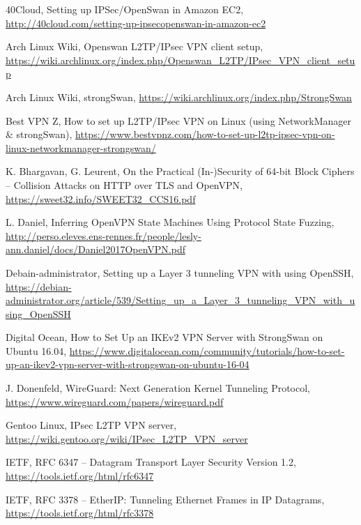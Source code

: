 \begin{thebibliography}{10}

  40Cloud, Setting up IPSec/OpenSwan in Amazon EC2,
  \url{http://40cloud.com/setting-up-ipsecopenswan-in-amazon-ec2}

  Arch Linux Wiki, Openswan L2TP/IPsec VPN client setup,
  \url{https://wiki.archlinux.org/index.php/Openswan_L2TP/IPsec_VPN_client_setup}

  Arch Linux Wiki, strongSwan,
  \url{https://wiki.archlinux.org/index.php/StrongSwan}

  Best VPN Z, How to set up L2TP/IPsec VPN on Linux (using NetworkManager \& strongSwan),
  \url{https://www.bestvpnz.com/how-to-set-up-l2tp-ipsec-vpn-on-linux-networkmanager-strongswan/}

  K. Bhargavan, G. Leurent, On the Practical (In-)Security of 64-bit Block Ciphers -- Collision Attacks on HTTP over TLS and OpenVPN,
  \url{https://sweet32.info/SWEET32_CCS16.pdf}

  L. Daniel, Inferring OpenVPN State Machines Using Protocol State Fuzzing,
  \url{http://perso.eleves.ens-rennes.fr/people/lesly-ann.daniel/docs/Daniel2017OpenVPN.pdf}

  Debain-administrator, Setting up a Layer 3 tunneling VPN with using OpenSSH,
  \url{https://debian-administrator.org/article/539/Setting_up_a_Layer_3_tunneling_VPN_with_using_OpenSSH}

  Digital Ocean, How to Set Up an IKEv2 VPN Server with StrongSwan on Ubuntu 16.04,
  \url{https://www.digitalocean.com/community/tutorials/how-to-set-up-an-ikev2-vpn-server-with-strongswan-on-ubuntu-16-04}

  J. Donenfeld, WireGuard: Next Generation Kernel Tunneling Protocol,
  \url{https://www.wireguard.com/papers/wireguard.pdf}

  Gentoo Linux, IPsec L2TP VPN server,
  \url{https://wiki.gentoo.org/wiki/IPsec_L2TP_VPN_server}

  IETF, RFC 6347 -- Datagram Transport Layer Security Version 1.2,
  \url{https://tools.ietf.org/html/rfc6347}

  IETF, RFC 3378 -- EtherIP: Tunneling Ethernet Frames in IP Datagrams,
  \url{https://tools.ietf.org/html/rfc3378}


\end{thebibliography}
